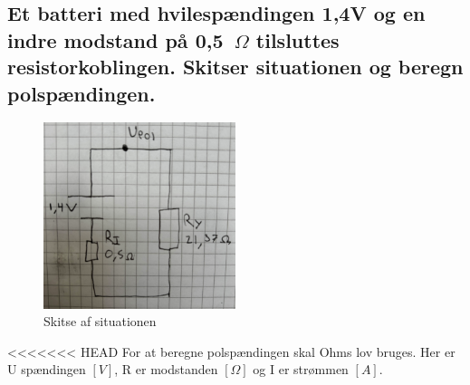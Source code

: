\subsection{Et batteri med hvilespændingen 1,4V og en indre modstand på 0,5~$\Omega$ tilsluttes resistorkoblingen. Skitser situationen og beregn polspændingen.}
\begin{figure}[h!]
    \centering
    \includegraphics[width=0.5\textwidth]{figures/ellareskitse.png}
    \caption{Skitse af situationen}
\end{figure}
<<<<<<< HEAD
For at beregne polspændingen skal Ohms lov bruges. Her er U spændingen $[V]$, R er modstanden $[\Omega]$ og I er strømmen $[A]$.

